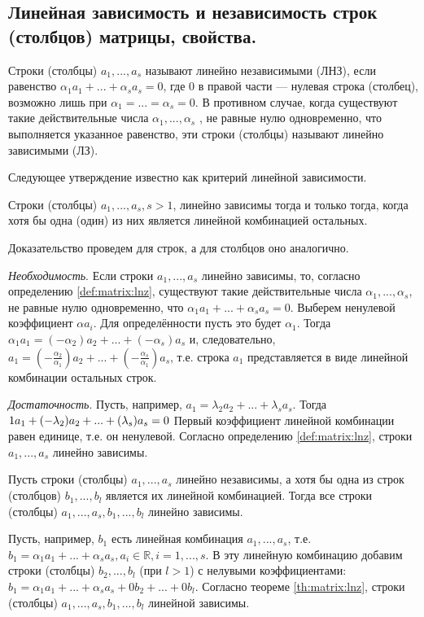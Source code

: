 \documentclass[a4paper,14pt]{article}
\begin{document}
\subsection{Линейная зависимость и независимость строк (столбцов) матрицы, свойства.}
\begin{definition}\label{def:matrix:lnz}
	Строки (столбцы) $a_1, ..., a_s$ называют линейно независимыми (ЛНЗ), если равенство $\alpha_1 a_1 + ... + \alpha_s a_s = 0$, где 0 в правой части — нулевая строка (столбец), возможно лишь при $\alpha_1=...=\alpha_s=0$. В противном случае, когда существуют такие действительные числа $\alpha_1,...,\alpha_s$ , не равные
	нулю одновременно, что выполняется указанное равенство, эти строки (столбцы) называют линейно зависимыми (ЛЗ).
\end{definition}
Следующее утверждение известно как критерий линейной зависимости.
\begin{theorem}\label{th:matrix:lnz}
	Строки (столбцы) $a_1, ..., a_s, s > 1$, линейно зависимы тогда и только тогда, когда хотя бы одна (один) из них является линейной комбинацией остальных.
	\begin{evidence}
		Доказательство проведем для строк, а для столбцов оно аналогично.
		
		\noindent \textit{Необходимость}. Если строки $a_1, ..., a_s$ линейно зависимы, то, согласно определению \ref{def:matrix:lnz}, существуют такие действительные числа $\alpha_1,...,\alpha_s$, не равные нулю одновременно, что $\alpha_1 a_1 + ... + \alpha_s a_s = 0$. Выберем ненулевой коэффициент $\alpha a_i$. Для определённости пусть это будет $\alpha_1$. Тогда $\alpha_1a_1=(-\alpha_2)a_2+...+(-\alpha_s)a_s$ и, следовательно, $a_1=(-\frac{\alpha_2}{\alpha_1})a_2+...+(-\frac{\alpha_s}{\alpha_1})a_s$, т.е. строка $a_1$ представляется в виде линейной комбинации остальных строк.
		
		\noindent \textit{Достаточность}. Пусть, например, $a_1=\lambda_2a_2+...+\lambda_sa_s$. Тогда $1a_1\hm{+}(-\lambda_2)a_2+...+(\lambda_s)a_s=0$ Первый коэффициент линейной комбинации равен единице, т.е. он ненулевой. Согласно определению \ref{def:matrix:lnz}, строки $a_1, ..., a_s$ линейно зависимы.
	\end{evidence}
\end{theorem}
\begin{theorem}
	Пусть строки (столбцы) $a_1, ..., a_s$ линейно независимы, а хотя бы одна из строк (столбцов) $b_1, ..., b_l$ является их линейной комбинацией. Тогда все строки (столбцы) $a_1, ..., a_s, b_1, ..., b_l$ линейно зависимы.
	\begin{evidence}
		Пусть, например, $b_1$ есть линейная комбинация $a_1, ..., a_s$, т.е. $b_1 = \alpha_1 a_1 + ... + \alpha_s a_s, a_i \in \mathbb{R}, i = 1,...,s$. В эту линейную комбинацию добавим строки (столбцы) $b_2, ..., b_l$ (при $l>1$) с нелувыми коэффициентами: $b_1 = \alpha_1 a_1 + ... + \alpha_s a_s + 0b_2 + ... + 0b_l$. Согласно теореме \ref{th:matrix:lnz}, строки (столбцы) $a_1, ..., a_s, b_1, ..., b_l$ линейной зависимы.
	\end{evidence}
\end{theorem}
\end{document}
